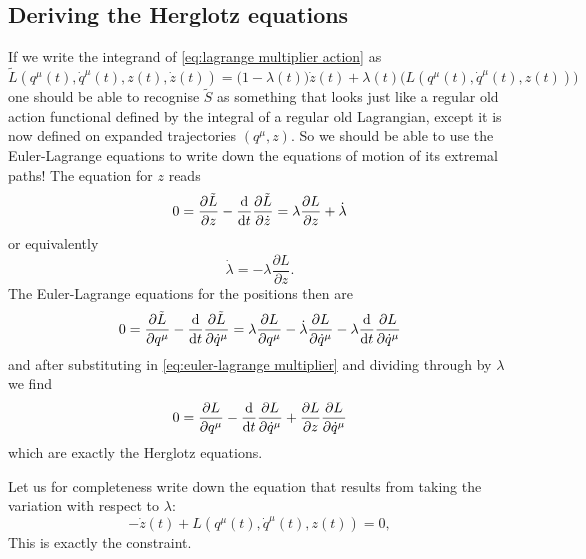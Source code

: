 \documentclass[../main.tex]{subfiles}
\begin{document}
\subsection{Deriving the Herglotz equations}
If we write the integrand of \cref{eq:lagrange multiplier action} as
\begin{equation*}
	\tilde{L}(q^\mu(t), \dot{q}^\mu(t), z(t), \dot{z}(t)) = \big(1 - \lambda(t)\big) \dot{z}(t) +
	\lambda(t)\big(L(q^\mu(t), \dot{q}^\mu(t), z(t))\big)
\end{equation*}
one should be able to recognise \( \tilde{S} \) as something that looks just like a
regular old action functional defined by the integral of a regular old Lagrangian, except
it is now defined on expanded trajectories \( (q^\mu, z) \). So we should be able to use
the Euler-Lagrange equations to write down the equations of motion of its extremal paths!
The equation for \( z \) reads
\begin{equation*}
	0 = \frac{\partial \tilde{L}}{\partial z} - \frac{\mathrm{d}}{\mathrm{d} t} \frac{\partial
	\tilde{L}}{\partial \dot{z}} = \lambda \frac{\partial L}{\partial z} + \dot{\lambda}
\end{equation*}
or equivalently
\begin{equation} \label{eq:euler-lagrange multiplier}
	\dot{\lambda} = -\lambda \frac{\partial L}{\partial z}. 
\end{equation}
The Euler-Lagrange equations for the positions then are
\begin{equation*}
	0 = \frac{\partial \tilde{L}}{\partial q^\mu} - \frac{\mathrm{d}}{\mathrm{d} t} \frac{\partial
	\tilde{L}}{\partial \dot{q}^\mu} = \lambda \frac{\partial L}{\partial q^\mu} -
	\dot{\lambda}\frac{\partial L}{\partial \dot{q}^\mu} - \lambda \frac{\mathrm{d}}{\mathrm{d}
	t}\frac{\partial L}{\partial \dot{q}^\mu}
\end{equation*}
and after substituting in \cref{eq:euler-lagrange multiplier} and dividing through by \(
\lambda \) we find
\begin{equation} \label{eq:euler-lagrange positions}
	0 = \frac{\partial L}{\partial q^\mu} - \frac{\mathrm{d}}{\mathrm{d} t} \frac{\partial L}{\partial
	\dot{q}^\mu} + \frac{\partial L}{\partial z}\frac{\partial L}{\partial \dot{q}^\mu}
\end{equation}
which are exactly the Herglotz equations. 

Let us for completeness write down the equation that results from taking the variation
with respect to \( \lambda \):
\begin{equation*}
	-\dot{z}(t) + L\left(q^\mu(t), \dot{q}^\mu(t), z(t)\right) = 0,
\end{equation*}
This is exactly the constraint. 
\end{document}
